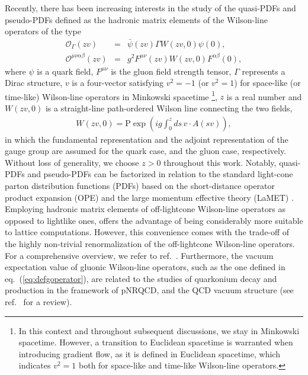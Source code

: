Recently, there has been increasing interests in the study of the quasi-PDFs and pseudo-PDFs defined as the hadronic matrix elements of the Wilson-line operators of the type
\begin{eqnarray}
\label{eq:defqoperator}
\mathcal{O}_{\Gamma}(zv) &=& \bar{\psi}(zv)\Gamma W(zv,0)\psi(0),\\
\label{eq:defgoperator}
\mathcal{O}^{\mu\nu\alpha\beta} (zv)&=& g^2 F^{\mu\nu}(zv)W(zv,0)F^{\alpha\beta}(0),
\end{eqnarray}
where $\psi$ is a quark field, $F^{\mu\nu}$ is the gluon field strength tensor, $\Gamma$ represents a Dirac structure, $v$ is a four-vector satisfying $v^2=-1$ (or $v^2=1$) for space-like (or time-like) Wilson-line operators in Minkowski spacetime \footnote{In this context and throughout subsequent discussions, we stay in Minkowski spacetime. However, a transition to Euclidean spacetime  is warranted when introducing gradient flow, as it is defined in Euclidean spacetime, which indicates $v^2=1$ both for space-like and time-like Wilson-line operators.}, $z$ is a real number and $W(zv, 0)$ is a straight-line path-ordered Wilson line connecting the two fields,
\begin{eqnarray}
W(zv, 0) = \text{P}\exp\left(ig\int_0^z ds\, v\cdot A(sv) \right),
\end{eqnarray}
in which the fundamental representation and the adjoint representation of the gauge group are assumed for the quark case, and the gluon case, respectively. Without loss of generality, we choose $z>0$ throughout this work. Notably,  quasi-PDFs and pseudo-PDFs can be factorized in relation to the standard light-cone parton distribution functions (PDFs) based on the short-distance operator product expansion (OPE) and the large momentum effective theory (LaMET) \cite{Braun:2007wv, Ji:2014gla,Izubuchi:2018srq}.  Employing hadronic matrix elements of  off-lightcone Wilson-line operators as opposed to lightlike ones, offers the advantage of being considerably more suitable to lattice computations. However, this convenience comes with the trade-off of the highly non-trivial renormalization of the off-lightcone Wilson-line operators. For a comprehensive overview, we refer to ref.~\cite{Ji:2020ect}.
Furthermore, the vacuum expectation value of gluonic Wilson-line operators, such as the one defined in eq.~(\ref{eq:defgoperator}), are related to the studies of quarkonium decay and production in the framework of pNRQCD, and the QCD vacuum structure 
(see ref.~\cite{DiGiacomo:2000irz} for a review).


